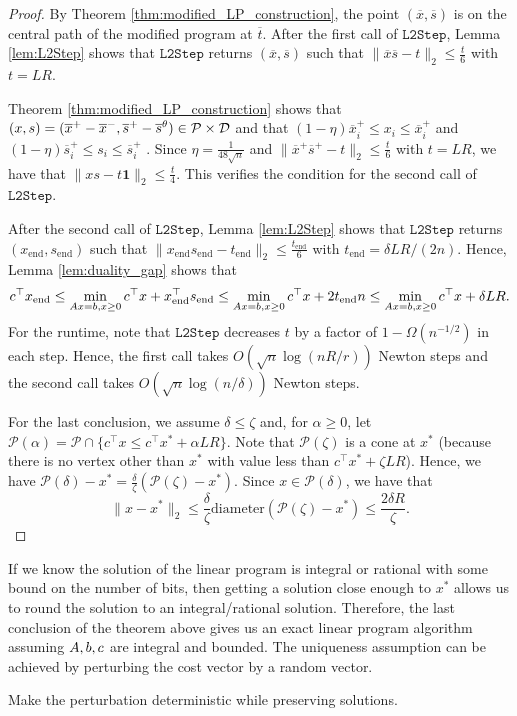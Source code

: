 \begin{proof}
By Theorem \ref{thm:modified_LP_construction}, the point $(\overline{x},\overline{s})$
is on the central path of the modified program at $\overline{t}$.
After the first call of $\mathtt{L2Step}$, Lemma \ref{lem:L2Step}
shows that $\mathtt{L2Step}$ returns $(\overline{x},\overline{s})$
such that $\|\overline{x}\overline{s}-t\|_{2}\leq\frac{t}{6}$ with
$t=LR$.

Theorem \ref{thm:modified_LP_construction} shows that $(x,s)=(\overline{x}^{+}-\overline{x}^{-},\overline{s}^{+}-\overline{s}^{\theta})\in\mathcal{P}\times\mathcal{D}$
and that $(1-\eta)\overline{x}^{+}_{i}\leq x_{i}\leq\overline{x}^{+}_{i}$
and $(1-\eta)\overline{s}^{+}_{i}\leq s_{i}\leq\overline{s}^{+}_{i}$
. Since $\eta=\frac{1}{48\sqrt{n}}$ and $\|\overline{x}^{+}\overline{s}^{+}-t\|_{2}\leq\frac{t}{6}$
with $t=LR$, we have that $\|xs-t\mathbf{1}\|_{2}\leq\frac{t}{4}$.
This verifies the condition for the second call of $\mathtt{L2Step}$.

After the second call of $\mathtt{L2Step}$, Lemma \ref{lem:L2Step}
shows that $\mathtt{L2Step}$ returns $(x_{\mathrm{end}},s_{\mathrm{end}})$
such that $\|x_{\mathrm{end}}s_{\mathrm{end}}-t_{\mathrm{end}}\|_{2}\leq\frac{t_{\mathrm{end}}}{6}$
with $t_{\mathrm{end}}=\delta LR/(2n)$. Hence, Lemma \ref{lem:duality_gap}
shows that 
\[
c^{\top}x_{\mathrm{end}}\leq\min_{A x=b,x\geq0}c^{\top}x+x^{\top}_{\mathrm{end}}s_{\mathrm{end}}\leq\min_{A x=b,x\geq0}c^{\top}x+2t_{\mathrm{end}}n\leq\min_{A x=b,x\geq0}c^{\top}x+\delta LR.
\]
For the runtime, note that $\mathtt{L2Step}$ decreases $t$ by a
factor of $1-\Omega(n^{-1/2})$ in each step. Hence, the first call
takes $O(\sqrt{n}\log(nR/r))$ Newton steps and the second call takes
$O(\sqrt{n}\log(n/\delta))$ Newton steps.

For the last conclusion, we assume $\delta\leq\zeta$ and, for $\alpha\geq0$,
let $\mathcal{P}(\alpha)=\mathcal{P}\cap\{c^{\top}x\leq c^{\top}x^{*}+\alpha LR\}$.
Note that $\mathcal{P}(\zeta)$ is a cone at $x^{*}$ (because there
is no vertex other than $x^{*}$ with value less than $c^{\top}x^{*}+\zeta LR$).
Hence, we have $\mathcal{P}(\delta)-x^{*}=\frac{\delta}{\zeta}(\mathcal{P}(\zeta)-x^{*})$.
Since $x\in\mathcal{P}(\delta)$, we have that 
\[
\|x-x^{*}\|_{2}\leq\frac{\delta}{\zeta}\text{diameter}(\mathcal{P}(\zeta)-x^{*})\leq\frac{2\delta R}{\zeta}.
\]
\end{proof}
If we know the solution of the linear program is integral or rational
with some bound on the number of bits, then getting a solution close
enough to $x^{*}$ allows us to round the solution to an integral/rational
solution. Therefore, the last conclusion of the theorem above gives
us an exact linear program algorithm assuming $A,b,c$ are integral
and bounded. The uniqueness assumption can be achieved by perturbing
the cost vector by a random vector.
\begin{xca}
Make the perturbation deterministic while preserving solutions.
\end{xca}


